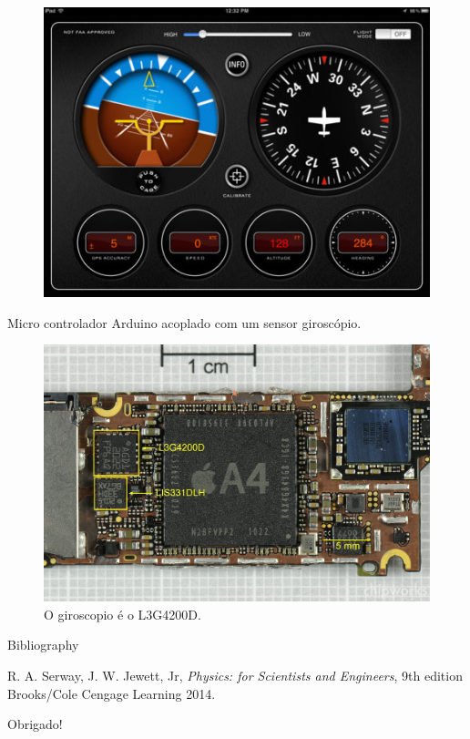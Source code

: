 \documentclass{beamer}
\begin{document}
\begin{frame}
\begin{figure}
\includegraphics[width=3.5 in]{figuras/aviao.jpg}
\end{figure}
Micro controlador Arduino acoplado com um sensor giroscópio.
\end{frame}



\begin{frame}
\begin{figure}
\includegraphics[width=3.7 in]{figuras/giroscopio_iphone.jpg}
\caption{O giroscopio é o L3G4200D.}
\end{figure}
\end{frame}







\begin{thebibliography}{9}

      \begin{frame}[label=bibliography]{Bibliography}
      
 R. A. Serway, J. W. Jewett, Jr, \textit{Physics: for Scientists and Engineers}, 9th edition Brooks/Cole Cengage Learning 2014.

    \end{frame}
    \end{thebibliography}

\begin{frame}
\Huge{\centerline{Obrigado!}}
\end{frame}

\end{document}
